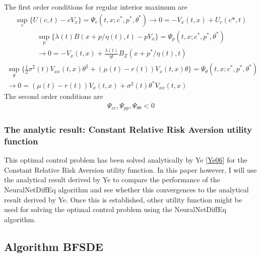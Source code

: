 \documentclass[letterpaper,10pt,english]{jupyterBook}
\begin{document}
\sphinxAtStartPar
The first order conditions for regular interior maximum are
\begin{equation*}
\begin{split}\sup_c  \{ U(c,t) - cV_x\} = \Psi_c(t,x;c^*,p^*,\theta^*)  \rightarrow  0 = -V_x(t,x) + U_c(c*,t) \end{split}
\end{equation*}\begin{equation*}
\begin{split} \sup_p\{\lambda(t)B(x + p/\eta(t),t) - pV_x\} = \Psi_p(t,x;c^*,p^*,\theta^*) \\ \rightarrow 0 = -V_x(t,x) + \frac{\lambda(t)}{\eta{t}}B_Z(x + p^*/\eta(t),t) \end{split}
\end{equation*}\begin{equation*}
\begin{split} \sup_\theta \{ \frac{1}{2}\sigma^2(t)V_{xx}(t,x)\theta^2 +(\mu(t) - r(t))V_x(t,x)\theta\} = \Psi_\theta(t,x;c^*,p^*,\theta^*)\\ \rightarrow 0 = (\mu(t) -r(t))V_x(t,x) + \sigma^2(t)\theta^*V_{xx}(t,x) \end{split}
\end{equation*}
\sphinxAtStartPar
The second order conditions are
\begin{equation*}
\begin{split} \Psi_{cc}, \Psi_{pp}, \Psi_{\theta \theta} < 0 \end{split}
\end{equation*}

\subsubsection{The analytic result: Constant Relative Risk Aversion utility function}
\label{\detokenize{Financial_application:the-analytic-result-constant-relative-risk-aversion-utility-function}}
\sphinxAtStartPar
This optimal control problem has been solved analytically by Ye {[}\hyperlink{cite.Financial_application:id24}{Ye06}{]} for the Constant Relative Risk Aversion utility function. In this paper however, I will use the analytical result derived by Ye to compare the performance of the NeuralNetDiffEq algorithm and see whether this convergences to the analytical result derived by Ye. Once this is established, other utility function might be used for solving the optimal control problem using the NeuralNetDiffEq algorithm.


\subsection{Algorithm BFSDE}
\label{\detokenize{Financial_application:algorithm-bfsde}}
\sphinxAtStartPar
\end{document}
